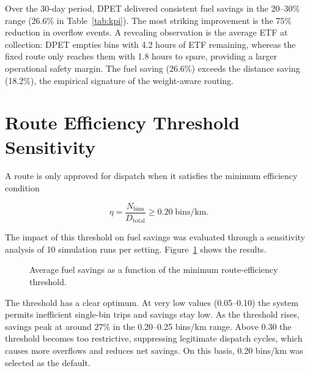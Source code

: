 \indent Over the 30-day period, DPET delivered consistent fuel savings in the 20--30\% range (26.6\% in Table~\ref{tab:kpi}). The most striking improvement is the 75\% reduction in overflow events. A revealing observation is the average ETF at collection: DPET empties bins with 4.2 hours of ETF remaining, whereas the fixed route only reaches them with 1.8 hours to spare, providing a larger operational safety margin. The fuel saving (26.6\%) exceeds the distance saving (18.2\%), the empirical signature of the weight-aware routing.

\section{Route Efficiency Threshold Sensitivity}
\label{sec:sensitivity}

\indent A route is only approved for dispatch when it satisfies the minimum efficiency condition

\begin{equation}
\eta = \frac{N_{\text{bins}}}{D_{\text{total}}} \geq 0.20 \;\text{bins/km}.
\label{eq:efficiency}
\end{equation}

\indent The impact of this threshold on fuel savings was evaluated through a sensitivity analysis of 10 simulation runs per setting. Figure~\ref{fig:threshold_sensitivity} shows the results.

\begin{figure}[H]
\centering
{}
\caption{Average fuel savings as a function of the minimum route-efficiency threshold.}
\label{fig:threshold_sensitivity}
\end{figure}

\indent The threshold has a clear optimum. At very low values (0.05--0.10) the system permits inefficient single-bin trips and savings stay low. As the threshold rises, savings peak at around 27\% in the 0.20--0.25 bins/km range. Above 0.30 the threshold becomes too restrictive, suppressing legitimate dispatch cycles, which causes more overflows and reduces net savings. On this basis, 0.20 bins/km was selected as the default.


